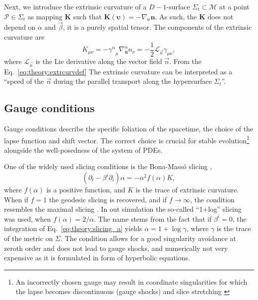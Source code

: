 
Next, we introduce the extrinsic curvature of a $D{-}1$-surface $\Sigma_t\subset\mathcal{M}$
at a point $\mathcal{P}\in\Sigma_t$ as mapping $\boldsymbol{K}$ such that $\boldsymbol{K}(\boldsymbol{\upsilon})=-\nabla_{\boldsymbol{\upsilon}}\boldsymbol{n}$. 
As such, the $\boldsymbol{K}$ does not depend on $\alpha$ and $\vec{\beta}$, 
it is a purely spatial tensor. 
The components of the extrinsic curvature are
%
\begin{equation}
    K_{\mu\nu} = -{\gamma^{\alpha}}_{\mu}\nabla_{\boldsymbol{u}}^{\alpha} n_{\nu} = -\frac{1}{2}\mathcal{L}_{\vec{n}}\gamma_{\mu\nu},
    \label{eq:theory:extrcurvdef}
\end{equation}
%
where $\mathcal{L}_{\vec{n}}$ is the Lie derivative along the vector field $\vec{n}$. 
From the Eq.~\ref{eq:theory:extrcurvdef} 
%
The extrinsic curvature can be interpreted as a ``speed of the $\vec{n}$ during the parallel 
transport along the hypersurface $\Sigma_t$''.


\subsection{Gauge conditions}

Gauge conditions describe the specific foliation of the spacetime, the choice of the 
lapse function and shift vector. The correct choice is crucial for stable evolution\footnote{
    An incorrectly chosen gauge may result in 
    coordinate singularities for which the lapse becomes discontinuous (gauge shocks)
    \citep{Alcubierre:2002kk} 
    and slice stretching \citep{Reimann:2004pn,Reimann:2004yf}
} alongside the well-posedness of the system of \acp{PDE}.
%

One of the widely used slicing conditions is the Bona-Mass{\'o} slicing \citep{Bona:1994dr}, 
%
\begin{equation}
    (\partial_t - \beta^i\partial_i)\alpha = -\alpha^2 f(\alpha)K,
    \label{eq:theory:slicing_a}
\end{equation}
%
where $f(\alpha)$ is a positive function, and $K$ is the trace of extrinsic curvature.
When if $f=1$ the geodesic slicing is recovered, and if $f\rightarrow\infty$, the condition 
resembles the maximal slicing \citep{Baumgarte:2002jm}.
%
In out simulation the so-called ``1+log'' slicing was used, when $f(\alpha) = 2/\alpha$.
%
The name stems from the fact that if $\beta^i = 0$, the integration of Eq.~\eqref{eq:theory:slicing_a} yields $\alpha = 1 + \log \gamma$, where $\gamma$ is the 
trace of the metric on $\Sigma$.
%
The condition allows for a good singularity avoidance at zeroth order \citep{Alcubierre:2002kk} and 
does not lead to gauge shocks, and numerically not very expensive as it is formulated in form 
of hyperbolic equations.

